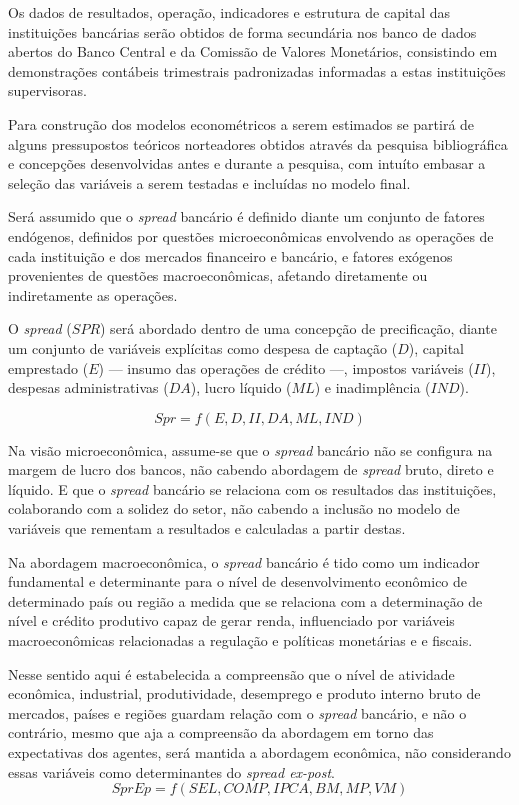 \documentclass[12pt,12pt,openright,oneside,a4paper,chapter=TITLE,section=TITLE,subsection=TITLE,subsubsection=TITLE english,french,spanish,portugues,sumario=tradicional]{abntex2}
\begin{document}
Os dados de resultados, operação, indicadores e estrutura de capital das instituições bancárias serão obtidos de forma secundária nos banco de dados abertos do Banco Central e da Comissão de Valores Monetários, consistindo em demonstrações contábeis trimestrais padronizadas informadas a estas instituições supervisoras.

Para construção dos modelos econométricos a serem estimados se partirá de alguns pressupostos teóricos norteadores obtidos através da pesquisa bibliográfica e concepções desenvolvidas antes e durante a pesquisa, com intuíto embasar a seleção das variáveis a serem testadas e incluídas no modelo final.

Será assumido que o \emph{spread} bancário é definido diante um conjunto de fatores endógenos, definidos por questões microeconômicas envolvendo as operações de cada instituição e dos mercados financeiro e bancário, e fatores exógenos provenientes de questões macroeconômicas, afetando diretamente ou indiretamente as operações.

O \emph{spread} (\(SPR\)) será abordado dentro de uma concepção de precificação, diante um conjunto de variáveis explícitas como despesa de captação (\(D\)), capital emprestado (\(E\)) --- insumo das operações de crédito ---, impostos variáveis (\(II\)), despesas administrativas (\(DA\)), lucro líquido (\(ML\)) e inadimplência (\(IND\)).

\[
Spr = f(E,D,II,DA,ML,IND)
\]

Na visão microeconômica, assume-se que o \emph{spread} bancário não se configura na margem de lucro dos bancos, não cabendo abordagem de \emph{spread} bruto, direto e líquido. E que o \emph{spread} bancário se relaciona com os resultados das instituições, colaborando com a solidez do setor, não cabendo a inclusão no modelo de variáveis que rementam a resultados e calculadas a partir destas.

Na abordagem macroeconômica, o \emph{spread} bancário é tido como um indicador fundamental e determinante para o nível de desenvolvimento econômico de determinado país ou região a medida que se relaciona com a determinação de nível e crédito produtivo capaz de gerar renda, influenciado por variáveis macroeconômicas relacionadas a regulação e políticas monetárias e e fiscais.

Nesse sentido aqui é estabelecida a compreensão que o nível de atividade econômica, industrial, produtividade, desemprego e produto interno bruto de mercados, países e regiões guardam relação com o \emph{spread} bancário, e não o contrário, mesmo que aja a compreensão da abordagem em torno das expectativas dos agentes, será mantida a abordagem econômica, não considerando essas variáveis como determinantes do \emph{spread ex-post}.
\[
SprEp = f(SEL,COMP,IPCA,BM,MP,VM)
\]
\end{document}
